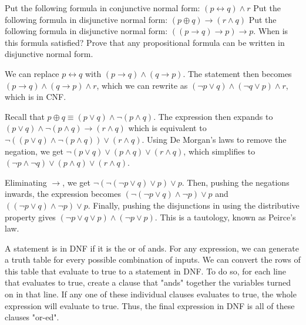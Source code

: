 \documentclass[solution, letterpaper]{cs20}
\begin{document}




\subproblem Put the following formula in conjunctive normal form: $(p \leftrightarrow q) \land r$
\subproblem Put the following formula in disjunctive normal form: $(p \oplus q) \rightarrow (r \land q)$
\subproblem Put the following formula in disjunctive normal form: $((p \rightarrow q) \rightarrow p) \rightarrow p$. When is this formula satisfied?
\subproblem Prove that any propositional formula can be written in disjunctive normal form. 

\begin{solution}
\subsolution  We can replace $p \leftrightarrow q$ with $(p \rightarrow q) \land (q \rightarrow p)$. The statement then becomes $(p \rightarrow q) \land (q \rightarrow p) \land r$, which we can rewrite as $(\lnot p \lor q) \land (\lnot q \lor p) \land r$, which is in CNF.

\subsolution Recall that $p \oplus q \equiv (p \lor q) \land \lnot (p \land q)$. The expression then expands to $(p \lor q) \land \lnot (p \land q) \rightarrow (r \land q)$ which is equivalent to $\lnot((p \lor q) \land \lnot (p \land q)) \lor (r \land q)$. Using De Morgan's laws to remove the negation, we get $\lnot (p \lor q) \lor (p \land q) \lor (r \land q)$, which simplifies to $(\lnot p \land \lnot q) \lor (p \land q) \lor (r \land q)$.

\subsolution Eliminating $\rightarrow$, we get $\lnot (\lnot (\lnot p \lor q) \lor p) \lor p$. Then, pushing the negations inwards, the expression becomes $(\lnot (\lnot p \lor q) \land \lnot p) \lor p$ and $((\lnot p \lor q) \land \lnot p) \lor p$. Finally, pushing the disjunctions in using the distributive property gives $(\lnot p \lor q \lor p) \land (\lnot p \lor p)$. This is a tautology, known as Peirce's law.

\subsolution A statement is in DNF if it is the or of ands. For any expression, we can generate a truth table for every possible combination of inputs. We can convert the rows of this table that evaluate to true to a statement in DNF. To do so, for each line that evaluates to true, create a clause that "ands" together the variables turned on in that line. If any one of these individual clauses evaluates to true, the whole expression will evaluate to true. Thus, the final expression in DNF is all of these clauses "or-ed". 

\end{solution}
\end{document}

